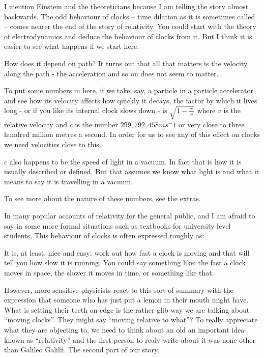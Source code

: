 \documentclass[a4paper]{report}
\begin{document}
I mention Einstein and the theoreticians because I am telling the story almost backwards. The odd behaviour of clocks -- time dilation as it is sometimes called -- comes nearer the end of the story of relativity. You could start with the theory of electrodynamics and deduce the behaviour of clocks from it. But I think it is easier to see what happens if we start here. 

How does it depend on path? It turns out that all that matters is the velocity along the path - the acceleration and so on does not seem to matter.

To put some numbers in here, if we take, say, a particle in a particle accelerator and see how its velocity affects how quickly it decays, the factor by which it lives long - or if you like its internal clock slows down - is $\sqrt{1 - \frac{v^2}{c^2}}$ where $v$ is the relative velocity and $c$ is the number $299,792,458ms^-1$ or very close to three hundred million metres a second. In order for us to see any of this effect on clocks we need velocities close to this.

$c$ also happens to be the speed of light in a vacuum. In fact that is how it is usually described or defined. But that assumes we know what light is and what it means to say it is travelling in a vacuum. 

To see more about the nature of these numbers, see the extras.

In many popular accounts of relativity for the general public, and I am afraid to say in some more formal situations such as textbooks for university level students, This behaviour of clocks is often expressed roughly as:


It is, at least, nice and easy: work out how fast a clock is moving and that will tell you how slow it is running. You could say something like: the fast a clock moves in space, the slower it moves in time, or something like that.

However, more sensitive physicists react to this sort of summary with the expression that someone who has just put a lemon in their mouth might have. What is setting their teeth on edge is the rather glib way we are talking about ``moving clocks''. They might say ``moving relative to what''? To really appreciate what they are objecting to, we need to think about an old an important idea known as ``relativity'' and the first person to realy write about it was none other than Galileo Galilii. The second part of our story.
\end{document}

